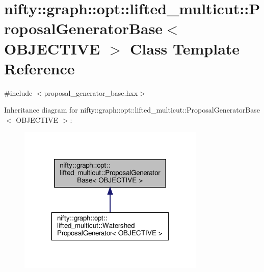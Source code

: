 \hypertarget{classnifty_1_1graph_1_1opt_1_1lifted__multicut_1_1ProposalGeneratorBase}{}\section{nifty\+:\+:graph\+:\+:opt\+:\+:lifted\+\_\+multicut\+:\+:Proposal\+Generator\+Base$<$ O\+B\+J\+E\+C\+T\+I\+VE $>$ Class Template Reference}
\label{classnifty_1_1graph_1_1opt_1_1lifted__multicut_1_1ProposalGeneratorBase}


{\ttfamily \#include $<$proposal\+\_\+generator\+\_\+base.\+hxx$>$}



Inheritance diagram for nifty\+:\+:graph\+:\+:opt\+:\+:lifted\+\_\+multicut\+:\+:Proposal\+Generator\+Base$<$ O\+B\+J\+E\+C\+T\+I\+VE $>$\+:
\nopagebreak
\begin{figure}[H]
\begin{center}
\leavevmode
\includegraphics[width=252pt]{classnifty_1_1graph_1_1opt_1_1lifted__multicut_1_1ProposalGeneratorBase__inherit__graph}
\end{center}
\end{figure}
